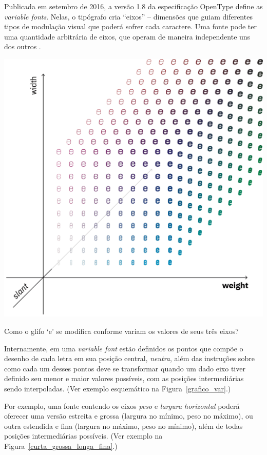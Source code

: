 \documentclass[a4paper]{tufte-handout}
\begin{document}
Publicada em setembro de 2016, a versão 1.8 da especificação OpenType define as \textit{variable fonts}. Nelas, o tipógrafo cria ``eixos'' -- dimensões que guiam diferentes tipos de modulação visual que poderá sofrer cada caractere. Uma fonte pode ter uma quantidade arbitrária de eixos, que operam de maneira independente uns dos outros \citep{varfontssepcs}. 

\begin{marginfigure}[-4\baselineskip]
  \includegraphics{imgs/grafico-var.png}
  \caption{Como o glifo `e' se modifica conforme variam os valores de seus três eixos?}
  \label{grafico_var}
\end{marginfigure}
    
Internamente, em uma \textit{variable font} estão definidos os pontos que compõe o desenho de cada letra em sua posição central, \textit{neutra}, além das instruções sobre como cada um desses pontos deve se transformar quando um dado eixo tiver definido seu menor e maior valores possíveis, com as posições intermediárias sendo interpoladas. (Ver exemplo esquemático na Figura~\ref{grafico_var}.)
    
Por exemplo, uma fonte contendo os eixos \textit{peso} e \textit{largura horizontal} poderá oferecer uma versão estreita e grossa (largura no mínimo, peso no máximo), ou outra estendida e fina (largura no máximo, peso no mínimo), além de todas posições intermediárias possíveis. (Ver exemplo na Figura~\ref{curta_grossa_longa_fina}.)
\end{document}
